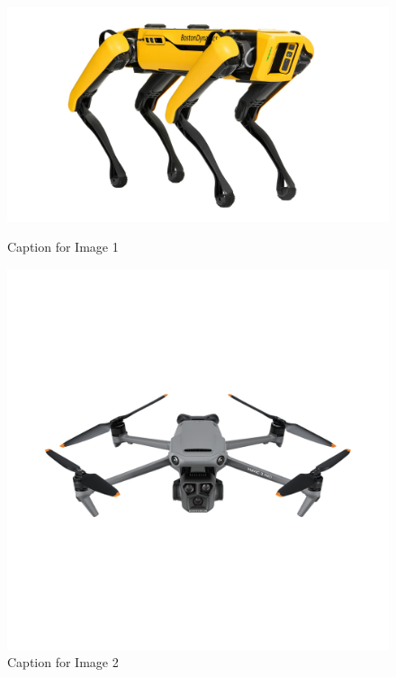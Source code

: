 \begin{figure}[!htbp]
  \centering
  \begin{minipage}[b]{0.40\textwidth}
    \centering
    \includegraphics[width=\textwidth]{figures/quadruped.jpg}
    \caption{Caption for Image 1}
    \label{fig:image1}
  \end{minipage}
  \hfill
  \begin{minipage}[b]{0.40\textwidth}
    \centering
    \includegraphics[width=\textwidth]{figures/quadcopter.png}
    \caption{Caption for Image 2}
    \label{fig:image2}
  \end{minipage}
  

\end{figure}
